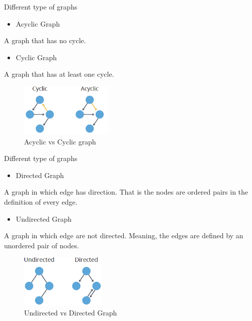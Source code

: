 \documentclass[ignorenonframetext,]{beamer}
\providecommand{\tightlist}{%
  \setlength{\itemsep}{0pt}\setlength{\parskip}{0pt}}
\begin{document}
\begin{frame}{Different type of graphs}
\protect\hypertarget{different-type-of-graphs}{}

\begin{itemize}
\tightlist
\item
  Acyclic Graph
\end{itemize}

A graph that has no cycle.

\begin{itemize}
\tightlist
\item
  Cyclic Graph
\end{itemize}

A graph that has at least one cycle.

\begin{figure}
\centering
\includegraphics[width=\textwidth,height=1in]{acyclic-cyclic.png}
\caption{Acyclic vs Cyclic graph}
\end{figure}

\end{frame}

\begin{frame}{Different type of graphs}
\protect\hypertarget{different-type-of-graphs-1}{}

\begin{itemize}
\tightlist
\item
  Directed Graph
\end{itemize}

A graph in which edge has direction. That is the nodes are ordered pairs
in the definition of every edge.

\begin{itemize}
\tightlist
\item
  Undirected Graph
\end{itemize}

A graph in which edge are not directed. Meaning, the edges are defined
by an unordered pair of nodes.

\begin{figure}
\centering
\includegraphics[width=\textwidth,height=1in]{undirected-directed.png}
\caption{Undirected vs Directed Graph}
\end{figure}

\end{frame}
\end{document}
